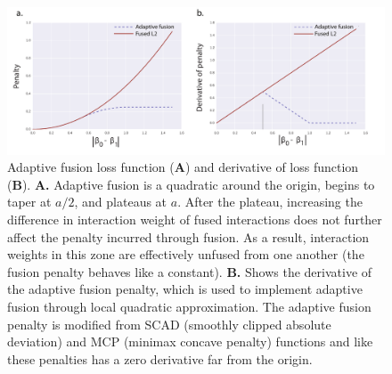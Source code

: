 \documentclass[11pt]{article}
\begin{document}
\begin{figure}
\begin{center}
  \includegraphics[scale=0.30]{fig3.pdf}
  \caption{\label{adapt-schematic} Adaptive fusion loss function (\textbf{A}) and derivative of loss function (\textbf{B}). 
  \textbf{A.} Adaptive fusion is a quadratic around the origin, begins to taper at $a/2$, and plateaus at $a$. After the plateau, increasing the difference in interaction weight of fused interactions does not further affect the penalty incurred through fusion. As a result, interaction weights in this zone are effectively unfused from one another (the fusion penalty behaves like a constant). 
  \textbf{B.} Shows the derivative of the adaptive fusion penalty, which is used to implement adaptive fusion through local quadratic approximation. The adaptive fusion penalty is modified from SCAD (smoothly clipped absolute deviation) and MCP (minimax concave penalty) functions and like these penalties has a zero derivative far from the origin. }
\end{center}
\end{figure}
\pagebreak
\end{document}

